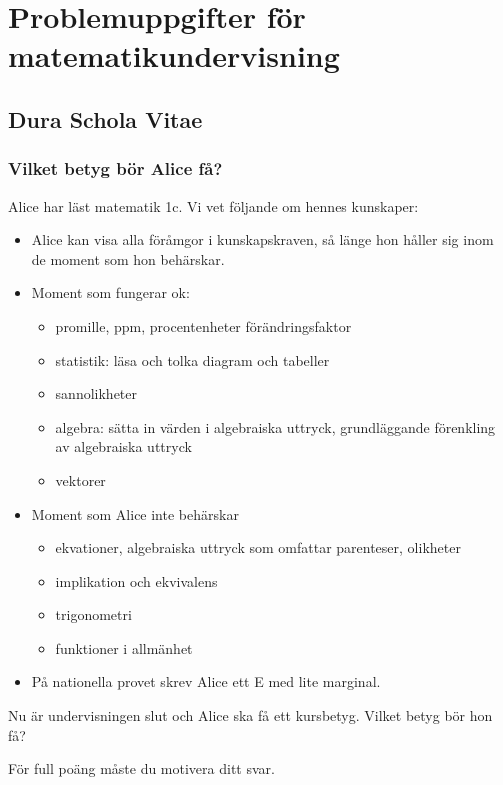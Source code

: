 \part*{Problemuppgifter för matematikundervisning}

\chapter{Dura Schola Vitae}

\setcounter{section}{0}
\section{Vilket betyg bör Alice få?}
Alice har läst matematik 1c. Vi vet följande om hennes kunskaper:

\begin{itemize}
  \item Alice kan visa alla föråmgor i kunskapskraven, så länge hon håller sig inom de moment som hon behärskar.
  \item Moment som fungerar ok:
    \begin{itemize}
      \item promille, ppm, procentenheter förändringsfaktor
      \item statistik: läsa och tolka diagram och tabeller
      \item sannolikheter
      \item algebra: sätta in värden i algebraiska uttryck, grundläggande förenkling av algebraiska uttryck
      \item vektorer
    \end{itemize}
  \item Moment som Alice inte behärskar
    \begin{itemize}
      \item ekvationer, algebraiska uttryck som omfattar parenteser, olikheter
      \item implikation och ekvivalens
      \item trigonometri
      \item funktioner i allmänhet
    \end{itemize}
  \item På nationella provet skrev Alice ett E med lite marginal.
\end{itemize}


Nu är undervisningen slut och Alice ska få ett kursbetyg. Vilket betyg bör hon få?

För full poäng måste du motivera ditt svar.